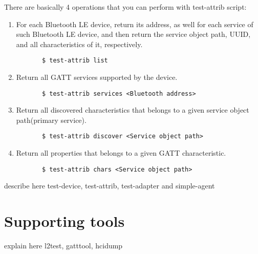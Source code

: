 \documentclass[11pt]{article}
\begin{document}
There are basically 4 operations that you can perform with test-attrib
script:
\begin{enumerate}
   \item For each Bluetooth LE device, return its address, as well for
     each service of such Bluetooth LE device, and then return the service
     object path, UUID, and all characteristics of it, respectively.
     \begin{verbatim}
       $ test-attrib list
     \end{verbatim}
   \item Return all GATT services supported by the device.
     \begin{verbatim}
       $ test-attrib services <Bluetooth address>
     \end{verbatim}
   \item Return all discovered characteristics that belongs to a
     given service object path(primary service).
     \begin{verbatim}
       $ test-attrib discover <Service object path>
     \end{verbatim}
   \item Return all properties that belongs to a given GATT characteristic.
     \begin{verbatim}
       $ test-attrib chars <Service object path>
     \end{verbatim}
\end{enumerate}

describe here test-device, test-attrib, test-adapter and simple-agent

\section{Supporting tools}

explain here l2test, gatttool, hcidump
\end{document}
